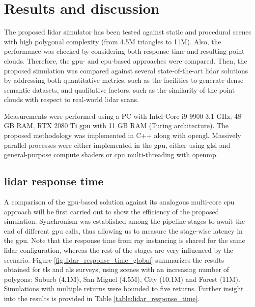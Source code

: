\section{Results and discussion}

The proposed \acrshort{lidar} simulator has been tested against static and procedural scenes with high polygonal complexity (from 4.5M triangles to 11M). Also, the performance was checked by considering both response time and resulting point clouds. Therefore, the \acrshort{gpu}- and \acrshort{cpu}-based approaches were compared. Then, the proposed simulation was compared against several state-of-the-art \acrshort{lidar} solutions by addressing both quantitative metrics, such as the facilities to generate dense semantic datasets, and qualitative factors, such as the similarity of the point clouds with respect to real-world \acrshort{lidar} scans. 

Measurements were performed using a PC with Intel Core i9-9900 3.1 GHz, 48 GB RAM, RTX 2080 Ti \acrshort{gpu} with 11 GB RAM (Turing architecture). The proposed methodology was implemented in C++ along with \acrshort{opengl}. Massively parallel processes were either implemented in the \acrshort{gpu}, either using \acrshort{glsl} and general-purpose compute shaders or \acrshort{cpu} multi-threading with \acrshort{openmp}. 

\subsection{\acrshort{lidar} response time}

A comparison of the \acrshort{gpu}-based solution against its analogous multi-core \acrshort{cpu} approach will be first carried out to show the efficiency of the proposed simulation. Synchronism was established among the pipeline stages to await the end of different \acrshort{gpu} calls, thus allowing us to measure the stage-wise latency in the \acrshort{gpu}. Note that the response time from ray instancing is shared for the same \acrshort{lidar} configuration, whereas the rest of the stages are very influenced by the scenario. Figure \ref{fig:lidar_response_time_global} summarizes the results obtained for \acrshort{tls} and \acrshort{als} surveys, using scenes with an increasing number of polygons: Suburb (4.1M), San Miguel (4.5M), City (10.1M) and Forest (11M). Simulations with multiple returns were bounded to five returns. Further insight into the results is provided in Table \ref{table:lidar_response_time}.

